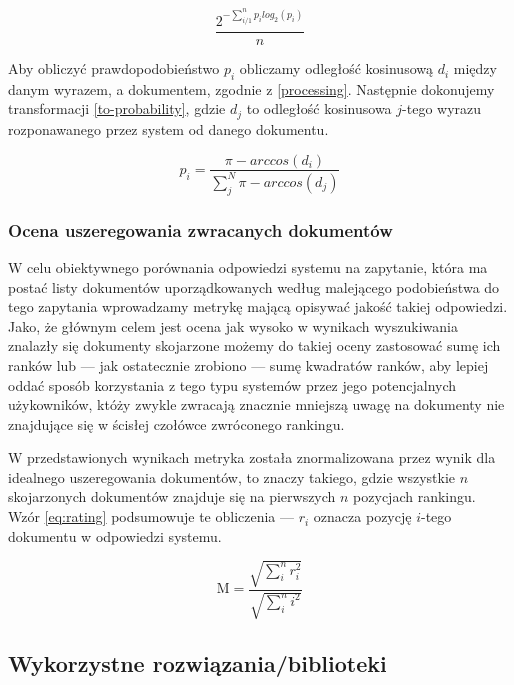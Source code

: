 \documentclass[11pt,a4paper]{article}
\begin{document}
\begin{equation}
  \label{perplexity}
  \frac{2^{-\sum_{i/1}^n p_ilog_2(p_i)}}{n}
\end{equation}

Aby obliczyć prawdopodobieństwo $p_i$ obliczamy odległość kosinusową $d_i$
między danym wyrazem, a dokumentem, zgodnie z \ref{processing}. Następnie
dokonujemy transformacji \ref{to-probability}, gdzie $d_j$ to odległość
kosinusowa $j$-tego wyrazu rozponawanego przez system od danego dokumentu.

\begin{equation}
  \label{to-probability}
  p_i = \frac{\pi - arccos(d_i)}{\sum_j^N \pi - arccos(d_j)}
\end{equation}

\subsubsection{Ocena uszeregowania zwracanych dokumentów}
\label{sec:ranking}

W celu obiektywnego porównania odpowiedzi systemu na zapytanie, która ma postać
listy dokumentów uporządkowanych według malejącego podobieństwa do tego
zapytania wprowadzamy metrykę mającą opisywać jakość takiej odpowiedzi. Jako,
że głównym celem jest ocena jak wysoko w wynikach wyszukiwania znalazły się
dokumenty skojarzone możemy do takiej oceny zastosować sumę ich ranków lub ---
jak ostatecznie zrobiono --- sumę kwadratów ranków, aby lepiej oddać sposób
korzystania z tego typu systemów przez jego potencjalnych użykowników, któży
zwykle zwracają znacznie mniejszą uwagę na dokumenty nie znajdujące się w
ścisłej czołówce zwróconego rankingu.

W przedstawionych wynikach metryka została znormalizowana przez wynik dla
idealnego uszeregowania dokumentów, to znaczy takiego, gdzie wszystkie $n$
skojarzonych dokumentów znajduje się na pierwszych $n$ pozycjach rankingu. Wzór
\ref{eq:rating} podsumowuje te obliczenia --- $r_i$ oznacza pozycję $i$-tego
dokumentu w odpowiedzi systemu.

\begin{equation}
  \label{eq:rating}
  \mathrm{M} = \frac{\sqrt{\sum_i^n r_i^2}}{\sqrt{\sum_i^n i^2}}
\end{equation}

\subsection{Wykorzystne rozwiązania/biblioteki}
\end{document}
